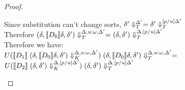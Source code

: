 \begin{proof}
\begin{enumerate}
\begin{itemize}
\begin{tabbedproof}
      \oooo Since substitution can't change sorts, $\restrictvals{\Delta'}{\delta'} = \restrictvals{[p/u]\Delta'}{\delta'}$ \\
      \oooo Therefore $\restrictvals{\Delta, u:\omega, \Delta'}{(\delta, \interp{D_0}\delta, \delta')} = \restrictvals{\Delta, [p/u]\Delta'}{(\delta, \delta')}$\\
      \oooo Therefore we have: \\
      \oooox $U(\interp{D_1}\;\restricttyenv{\Delta, u:\omega, \Delta'}
                                           {(\delta, \interp{D_0}\delta, \delta')})
             \;\restrictvals{\Delta, u:\omega, \Delta'}{(\delta, \interp{D_0}\delta, \delta')}
             =$ \\
      \oooox $U(\interp{D_2}\;\restricttyenv{\Delta, [p/u]\Delta'}
                                           {(\delta, \delta')})
             \;\restrictvals{\Delta, [p/u]\Delta'}{(\delta, \delta')}$\\


\end{tabbedproof}
\end{itemize}
\end{enumerate}
\end{proof}
